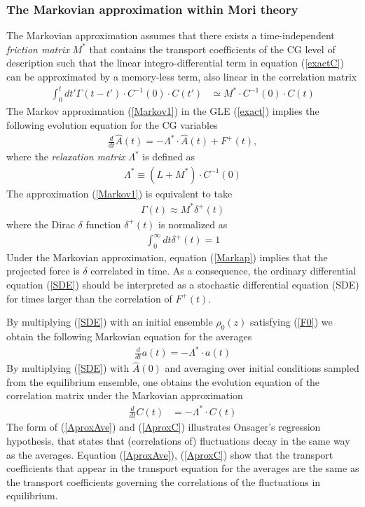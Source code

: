\documentclass[b5paper,openright,10pt]{book}
\newcommand{\esc}{\!\cdot\!}
\begin{document}
\subsubsection{The Markovian approximation within Mori theory}
\label{Sec:Markov}
The   Markovian   approximation   assumes    that   there   exists   a
time-independent \textit{friction matrix} $M^*$ that
  contains the transport  coefficients of the CG  level of description
such that  the linear integro-differential term  in equation (\ref{exactC})
can  be  approximated  by  a  memory-less term,  also  linear  in  the
correlation matrix
\begin{align}
\int_0^tdt' \Gamma(t-t')\esc C^{-1}(0)\esc  C(t')&\simeq M^*\esc C^{-1}(0)\esc C(t)
\label{Markov1}
\end{align}
The  Markov approximation  (\ref{Markov1})  in  the GLE  (\ref{exact})
implies the following evolution equation for the CG variables
\begin{align}
  \frac{d}{dt}\hat{A}(t) = -\Lambda^*\esc \hat{A} (t) +F^+(t),
\label{SDE}
\end{align}
where the \textit{relaxation matrix} $\Lambda^*$ is defined as
\begin{align}
\Lambda^*\equiv(L+M^*)\esc C^{-1}(0)  
\label{Lambda}
\end{align}
The   approximation
(\ref{Markov1}) is equivalent to take
\begin{align}
  \Gamma(t) \approx M^*\delta^+(t)
\label{Markap}
\end{align}
where   the Dirac $\delta$ function
$\delta^+(t)$ is normalized as
\begin{align}
  \int_0^\infty dt \delta^+(t) =1
\end{align}
Under the  Markovian approximation,  equation  (\ref{Markap})  implies that
the projected  force is $\delta$ correlated  in time. As a  consequence, the
ordinary differential equation (\ref{SDE}) should be interpreted as a
stochastic  differential  equation (SDE)  for  times  larger than  the
correlation of $F^+(t)$.

By multiplying (\ref{SDE}) with an initial ensemble $\rho_0(z)$
satisfying (\ref{F0})
we obtain the following Markovian equation for the averages
\begin{align}
  \frac{d}{dt}a(t) = -\Lambda^*\esc a(t)
\label{AproxAve}
\end{align}
By  multiplying  (\ref{SDE})  with $\hat{A}(0)$  and  averaging  over
initial conditions sampled from  the equilibrium ensemble, one obtains
the evolution  equation of the  correlation matrix  under the
Markovian   approximation
\begin{align}
    \frac{d}{dt}C(t)&=-\Lambda^*\esc  C(t)
\label{AproxC}
\end{align}
The form of (\ref{AproxAve})  and (\ref{AproxC}) illustrates Onsager's
regression hypothesis, that states that (correlations of) fluctuations
decay  in  the  same  way  as  the  averages.   Equation  (\ref{AproxAve}),
(\ref{AproxC}) show that the transport coefficients that appear in the
transport  equation for  the averages  are the  same as  the transport
coefficients  governing  the  correlations   of  the  fluctuations  in
equilibrium.
\end{document}
